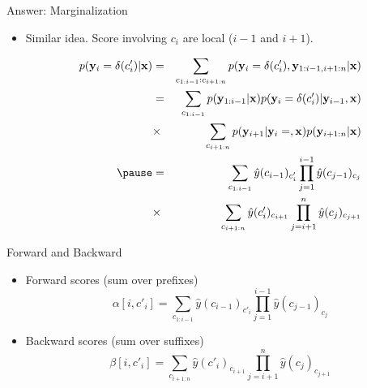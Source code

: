\documentclass{beamer}
\begin{document}
\begin{frame}{Answer: Marginalization}
  \begin{itemize}
  \item Similar idea. Score involving $c_i$ are local ($i-1$ and $i+1$).
    \air 


    \begin{eqnarray*}
    p(\boldy_i = \delta(c'_i)| \boldx) &=& \sum_{c_{1:i-1}:c_{i+1:n}} p(\bold{y}_i = \delta(c'_i),  \boldy_{1:i-1,i+1:n}| \boldx ) \\ 
                                       &=& \sum_{c_{1:i-1}} p(\boldy_{1:i-1}|\boldx) p(\bold{y}_i = \delta(c'_i)|  \boldy_{i-1},  \boldx ) \\
                                       &\times&  \sum_{c_{i+1:n}} p(\bold{y}_{i+1}| \boldy_{i} = , \boldx) p(\bold{y}_{i+1:n}|\boldx) \\       \pause
                                       &= & \sum_{c_{1:i-1}} \hat{y}(c_{i-1})_{c'_{i}}  \prod_{j=1}^{i-1} \hat{y}(c_{j-1})_{c_{j}}  \\
                                       &\times& \sum_{c_{i+1:n}}  \hat{y}(c'_{i})_{c_{i+1}} \prod_{j=i+1}^n   \hat{y}(c_{j})_{c_{j+1}} \\      
    \end{eqnarray*}
    \air 
  \end{itemize}
\end{frame}

\begin{frame}{Forward and Backward}
  \begin{itemize}
  \item  Forward scores (sum over prefixes)
    \[ \alpha[i, c'_i] = \sum_{c_{1:i-1}} \hat{y}(c_{i-1})_{c'_{i}}  \prod_{j=1}^{i-1} \hat{y}(c_{j-1})_{c_{j}}  \]

    \air
  \item  Backward scores (sum over suffixes)
   \[ \beta[i, c'_i] = \sum_{c_{i+1:n}}  \hat{y}(c'_{i})_{c_{i+1}} \prod_{j=i+1}^n   \hat{y}(c_{j})_{c_{j+1}}  \]
  \end{itemize}
\end{frame}
\end{document}

